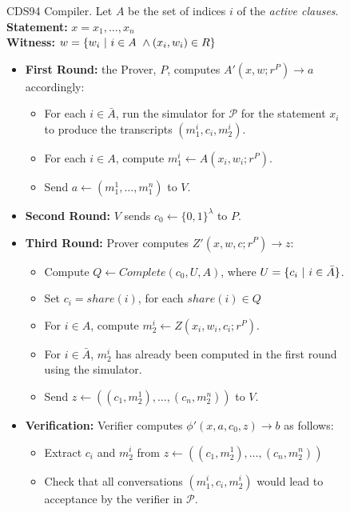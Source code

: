 \begin{figure}
    \centering
    \begin{protocol}[]{CDS94 Compiler. Let $A$ be the set of indices $i$ of the \textit{active clauses}.} 
       \textbf{Statement:} $x = x_1,\ldots, x_n$ \\
       \textbf{Witness:} $w = \{w_i\ \vert\  i \in A\ \land (x_i, w_i) \in R\}$
       \begin{itemize}
           \item \textbf{First Round:} the Prover, $P$, computes $A'(x,w; r^P) \rightarrow a$ accordingly:
           \begin{itemize}
               \item For each $i \in \bar A$, run the simulator for $\mathcal P$ for the statement $x_i$ to produce the transcripts $(m_1^i, c_i, m_2^i)$.
               \item For each $i \in A$, compute $m_1^i \leftarrow A(x_i, w_i; r^P)$.
               \item Send $a \leftarrow (m_1^1, \ldots, m_1^n)$ to $V$.
           \end{itemize}
           \item \textbf{Second Round:} $V$ sends $c_0 \leftarrow \{0,1\}^\lambda$ to $P$. 
           \item \textbf{Third Round:} Prover computes $Z'(x,w,c;r^P) \rightarrow z$:
           \begin{itemize}
               \item Compute $Q \leftarrow Complete(c_0, U, A)$, where $U = \{c_i\ \vert\  i \in \bar A\}$.
               \item Set $c_i = share(i)$, for each $share(i) \in Q$
               \item For $i \in A$, compute $m_2^i \leftarrow Z(x_i, w_i, c_i; r^P)$. 
               \item For $i \in \bar A$, $m_2^i$ has already been computed in the first round using the simulator.
               \item Send $z \leftarrow ((c_1, m_2^1), \ldots, (c_n,m_2^n))$ to $V$.
           \end{itemize}
           \item \textbf{Verification:} Verifier computes $\phi'(x,a,c_0,z) \rightarrow b$ as follows:
           \begin{itemize}
               \item Extract $c_i$ and $m_2^i$ from $z \leftarrow ((c_1, m_2^1), \ldots, (c_n,m_2^n))$
               \item Check that all conversations $(m_1^i, c_i, m_2^i)$ would lead to acceptance by the verifier in $\mathcal P$.

\end{itemize}
\end{itemize}
\end{protocol}
\end{figure}
